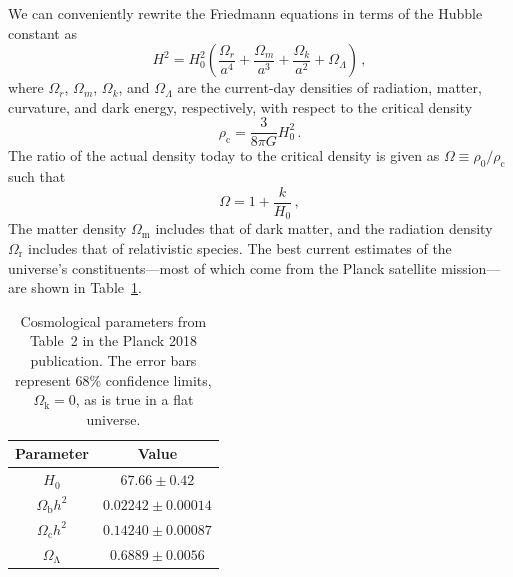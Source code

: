 We can conveniently rewrite the Friedmann equations in terms of the Hubble constant as
\begin{equation}
    H^{2} = H_{0}^{2} \left( \frac{\Omega_{r}}{a^{4}} + \frac{\Omega_{m}}{a^{3}} + \frac{\Omega_{k}}{a^{2}} + \Omega_{\Lambda} \right) \, ,
    \label{eq:friedmann_equation_densities}
\end{equation}
where $\Omega_{r}$, $\Omega_{m}$, $\Omega_{k}$, and $\Omega_{\Lambda}$ are the current-day densities of radiation, matter, curvature, and dark energy, respectively, with respect to the critical density
\begin{equation}
    \rho_{\mathrm{c}} = \frac{3}{8 \pi G} H_{0}^{2}\, .
    \label{eq:critical_density}
\end{equation}
The ratio of the actual density today to the critical density is given as $\Omega \equiv \rho_{0} / \rho_{\mathrm{c}}$ such that 
\begin{equation}
    \Omega = 1 + \frac{k}{H_{0}} \, ,
    \label{eq:total_density}
\end{equation}
The matter density $\Omega_{\mathrm{m}}$ includes that of dark matter, and the radiation density $\Omega_{\mathrm{r}}$ includes that of relativistic species. The best current estimates of the universe's constituents---most of which come from the Planck satellite mission---are shown in Table~\ref{tab:cosmological_parameters}. 

\begin{table}[]
    \centering
    \begin{tabular}{c|c}
         Parameter & Value \\
         \hline
         \hline
         $H_{0}$ & $67.66 \pm 0.42$ \\
         \hline
         $\Omega_{\mathrm{b}} h^{2}$ & $0.02242 \pm 0.00014$ \\
         \hline
         $\Omega_{\mathrm{c}} h^{2}$ & $0.14240 \pm 0.00087$ \\
         \hline
         $\Omega_{\mathrm{\Lambda}}$ & $0.6889 \pm 0.0056$ \\
         \hline
    \end{tabular}
    \caption{Cosmological parameters from Table~2 in the Planck 2018 publication. The error bars represent 68\% confidence limits, $\Omega_{\mathrm{k}} = 0$, as is true in a flat universe.}
    \label{tab:cosmological_parameters}
\end{table}


